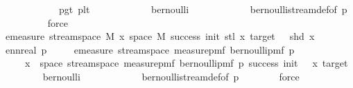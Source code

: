 \begin{isabellebody}
\ \ \ \ \ \ \ \ \ \ \ \ p{\isacharunderscore}{\kern0pt}gt{\isacharunderscore}{\kern0pt}{}\ p{\isacharunderscore}{\kern0pt}lt{\isacharunderscore}{\kern0pt}{}\isanewline
\ \ \ \ \ \ \ \ \ \ \ \ bernoulli\isanewline
\ \ \ \ \ \ \ \ \ \ \ \ bernoulli{\isacharunderscore}{\kern0pt}stream{\isacharunderscore}{\kern0pt}def{\isacharbrackleft}{\kern0pt}of\ p{\isacharbrackright}{\kern0pt}\isanewline
\ \ \ \ \ \ \ \ \isamarkupfalse%
\ force\isanewline
\isanewline
\ \ \ \ \isamarkupfalse%
\isanewline
\ \ \ \ \isamarkupfalse%
\ \isamarkupfalse%
\ {\isachardoublequoteopen}emeasure\ {\isacharparenleft}{\kern0pt}stream{\isacharunderscore}{\kern0pt}space\ {\isacharquery}{\kern0pt}M{\isacharparenright}{\kern0pt}\ {\isacharbraceleft}{\kern0pt}x{\isasymin}\ space\ M{\isachardot}{\kern0pt}\ success\ {\isacharparenleft}{\kern0pt}init{\isacharminus}{\kern0pt}{}{\isacharparenright}{\kern0pt}\ {\isacharparenleft}{\kern0pt}stl\ x{\isacharparenright}{\kern0pt}\ target\ {\isasymand}\ {\isasymnot}\ shd\ x{\isacharbraceright}{\kern0pt}\ \isanewline
{\isacharequal}{\kern0pt}\ ennreal\ {\isacharparenleft}{\kern0pt}{}{\isacharminus}{\kern0pt}p{\isacharparenright}{\kern0pt}\ {\isacharasterisk}{\kern0pt}\isanewline
\ \ \ \ emeasure\ {\isacharparenleft}{\kern0pt}stream{\isacharunderscore}{\kern0pt}space\ {\isacharparenleft}{\kern0pt}measure{\isacharunderscore}{\kern0pt}pmf\ {\isacharparenleft}{\kern0pt}bernoulli{\isacharunderscore}{\kern0pt}pmf\ p{\isacharparenright}{\kern0pt}{\isacharparenright}{\kern0pt}{\isacharparenright}{\kern0pt}\isanewline
\ \ \ \ \ {\isacharbraceleft}{\kern0pt}x\ {\isasymin}\ space\ {\isacharparenleft}{\kern0pt}stream{\isacharunderscore}{\kern0pt}space\ {\isacharparenleft}{\kern0pt}measure{\isacharunderscore}{\kern0pt}pmf\ {\isacharparenleft}{\kern0pt}bernoulli{\isacharunderscore}{\kern0pt}pmf\ p{\isacharparenright}{\kern0pt}{\isacharparenright}{\kern0pt}{\isacharparenright}{\kern0pt}{\isachardot}{\kern0pt}\ success\ {\isacharparenleft}{\kern0pt}init\ {\isacharminus}{\kern0pt}\ {}{\isacharparenright}{\kern0pt}\ x\ target{\isacharbraceright}{\kern0pt}{\isachardoublequoteclose}\isanewline
\ \ \ \ \ \ \isamarkupfalse%
\ \ bernoulli\isanewline
\ \ \ \ \ \ \ \ \ \ \ \ bernoulli{\isacharunderscore}{\kern0pt}stream{\isacharunderscore}{\kern0pt}def{\isacharbrackleft}{\kern0pt}of\ p{\isacharbrackright}{\kern0pt}\isanewline
\ \ \ \ \ \ \isamarkupfalse%
\ force\isanewline
\ \ \ \ \isamarkupfalse%

\end{isabellebody}
